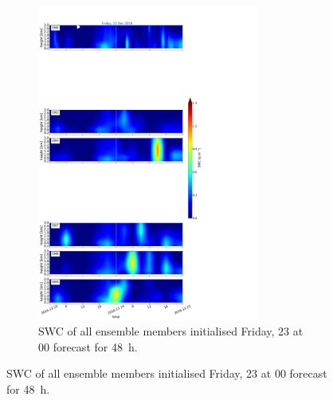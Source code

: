 \begin{figure}[t]\ContinuedFloat
	\centering
	\begin{subfigure}[t]{\textwidth} 
		\centering
		\includegraphics[trim={0cm 0cm 18.3cm 5.1cm},clip,width=0.8\textwidth]{./fig_09EM/20161223}
		\caption{SWC of all ensemble members initialised Friday, \SI{23}{\dec} at 0\SI{0}{\UTC} forecast for \SI{48}{\hour}.}\label{fig:EM09_23}
	\end{subfigure}
	\centering
\end{figure}
